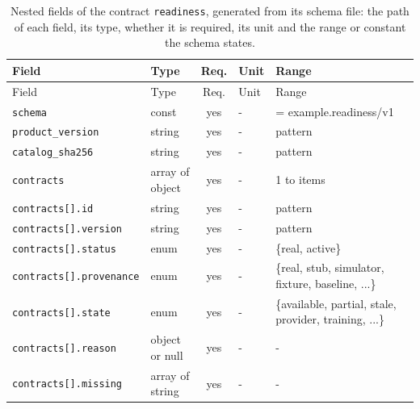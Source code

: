 \begingroup\scriptsize
\begin{longtable}{@{}l l c l l@{}}
\caption{Nested fields of the contract \texttt{readiness}, generated from its schema file: the path of each field, its type, whether it is required, its unit and the range or constant the schema states.}\label{tab:fields-readiness}\\
\toprule Field & Type & Req. & Unit & Range\\\midrule\endfirsthead
\toprule Field & Type & Req. & Unit & Range\\\midrule\endhead
\texttt{schema} & const & yes & - & = example.readiness/v1\\
\texttt{product\_version} & string & yes & - & pattern\\
\texttt{catalog\_sha256} & string & yes & - & pattern\\
\texttt{contracts} & array of object & yes & - & 1 to items\\
\texttt{contracts[].id} & string & yes & - & pattern\\
\texttt{contracts[].version} & string & yes & - & pattern\\
\texttt{contracts[].status} & enum & yes & - & \{real, active\}\\
\texttt{contracts[].provenance} & enum & yes & - & \{real, stub, simulator, fixture, baseline, ...\}\\
\texttt{contracts[].state} & enum & yes & - & \{available, partial, stale, provider, training, ...\}\\
\texttt{contracts[].reason} & object or null & yes & - & -\\
\texttt{contracts[].missing} & array of string & yes & - & -\\
\bottomrule\end{longtable}
\endgroup
